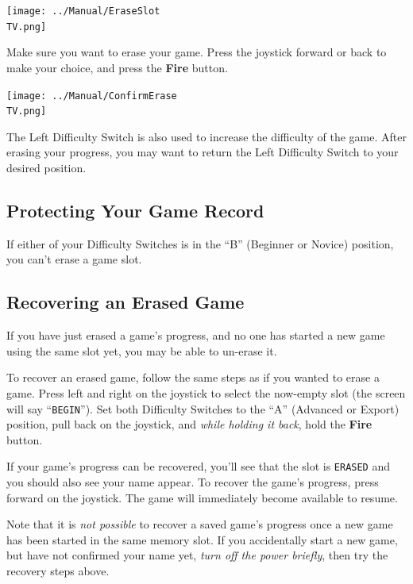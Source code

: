 \documentclass[10pt,twocolumn,openany,article]{memoir}
\newcommand\TV{NTSC}
\newcommand\TV{PAL}
\begin{document}
\begin{center}
  \texttt{[image: ../Manual/EraseSlot\\TV.png]}
\end{center}

Make sure  you want to  erase your game.  Press the joystick  forward or
back to make your choice, and press the \textbf{Fire} button.

\begin{center}
  \texttt{[image: ../Manual/ConfirmErase\\TV.png]}
\end{center}

The Left  Difficulty Switch is also  used to increase the  difficulty of
the game. After  erasing your progress, you may want  to return the Left
Difficulty Switch to your desired position.

\subsection{Protecting Your Game Record}

If  either of  your Difficulty  Switches is  in the  ``B'' (Beginner  or
Novice) position, you can't erase a game slot.

\subsection{Recovering an Erased Game}

If you have just erased a game's  progress, and no one has started a new
game using the same slot yet, you may be able to un-erase it.

To recover  an erased game,  follow the same steps  as if you  wanted to
erase  a game.  Press  left and  right  on the  joystick  to select  the
now-empty  slot  (the  screen  will say  ``\texttt{BEGIN}'').  Set  both
Difficulty Switches  to the  ``A'' (Advanced  or Export)  position, pull
back  on  the joystick,  and  \emph{while  holding  it back},  hold  the
\textbf{Fire} button.

If your  game's progress can be  recovered, you'll see that  the slot is
\texttt{ERASED} and you should also see your name appear. To recover the
game's progress, press forward on the joystick. The game will immediately
become available to resume.

Note that it  is \emph{not possible} to recover a  saved game's progress
once  a new  game has  been  started in  the  same memory  slot. If  you
accidentally start  a new game,  but have  not confirmed your  name yet,
\emph{turn off the power briefly}, then try the recovery steps above.
\end{document}
